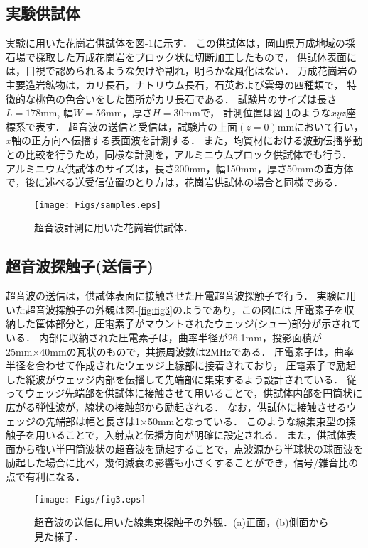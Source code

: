 ﻿%
\subsection{実験供試体}
実験に用いた花崗岩供試体を図-\ref{fig:fig1}に示す．
この供試体は，岡山県万成地域の採石場で採取した万成花崗岩をブロック状に切断加工したもので，
供試体表面には，目視で認められるような欠けや割れ，明らかな風化はない．
万成花崗岩の主要造岩鉱物は，カリ長石，ナトリウム長石，石英および雲母の四種類で，
特徴的な桃色の色合いをした箇所がカリ長石である．
試験片のサイズは長さ$L=178$mm, 幅$W=56$mm，厚さ$H=30$mmで，
計測位置は図-\ref{fig:fig1}のような$xyz$座標系で表す．
超音波の送信と受信は，試験片の上面$(z=0)$mmにおいて行い，$x$軸の正方向へ伝播する表面波を計測する．
また，均質材における波動伝播挙動との比較を行うため，同様な計測を，アルミニウムブロック供試体でも行う．
アルミニウム供試体のサイズは，長さ200mm，幅150mm，厚さ50mmの直方体で，後に述べる送受信位置のとり方は，花崗岩供試体の場合と同様である．
\begin{figure}
\begin{center}
\texttt{[image: Figs/samples.eps]}
\caption{
	超音波計測に用いた花崗岩供試体．
}
\label{fig:fig1}
\end{center}
\end{figure}
\subsection{超音波探触子(送信子)}
超音波の送信は，供試体表面に接触させた圧電超音波探触子で行う．
実験に用いた超音波探触子の外観は図-\ref{fig:fig3}のようであり，この図には
圧電素子を収納した筐体部分と，圧電素子がマウントされたウェッジ(シュー)部分が示されている．
内部に収納された圧電素子は，曲率半径が26.1mm，投影面積が25mm×40mmの瓦状のもので，共振周波数は2MHzである．
圧電素子は，曲率半径を合わせて作成されたウェッジ上縁部に接着されており，
圧電素子で励起した縦波がウェッジ内部を伝播して先端部に集束するよう設計されている．
従ってウェッジ先端部を供試体に接触させて用いることで，供試体内部を円筒状に広がる弾性波が，線状の接触部から励起される．
なお，供試体に接触させるウェッジの先端部は幅と長さは1×50mmとなっている．
このような線集束型の探触子を用いることで，入射点と伝播方向が明確に設定される．
また，供試体表面から強い半円筒波状の超音波を励起することで，点波源から半球状の球面波を励起した場合に比べ，幾何減衰の影響も小さくすることができ，信号/雑音比の点で有利になる．
\begin{figure}[h]
\begin{center}
\texttt{[image: Figs/fig3.eps]}
\caption{
	超音波の送信に用いた線集束探触子の外観．(a)正面，(b)側面から見た様子．
}
\label{fig:fig2}
\end{center}
\end{figure}
